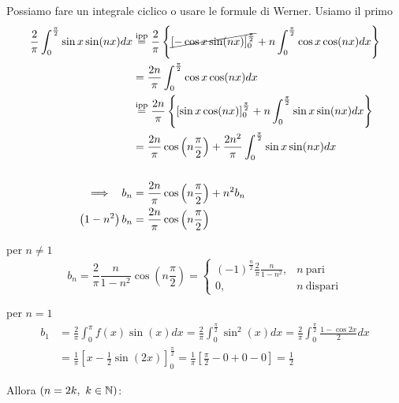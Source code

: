 \begin{enumerate}
Possiamo fare un integrale ciclico o usare le formule di Werner. Usiamo il primo\begin{align*}
\frac{2}{\pi }\int ^{\frac{\pi }{2}}_{0}\sin x\sin( nx) dx & \overset{\text{ipp}}{=}\frac{2}{\pi }\left\{\cancel{[ -\cos x\sin( nx)]^{\frac{\pi }{2}}_{0}} +n\int ^{\frac{\pi }{2}}_{0}\cos x\cos( nx) dx\right\}\\
 & =\frac{2n}{\pi }\int ^{\frac{\pi }{2}}_{0}\cos x\cos( nx) dx\\
 & \overset{\text{ipp}}{=}\frac{2n}{\pi }\left\{[\sin x\cos( nx)]^{\frac{\pi }{2}}_{0} +n\int ^{\frac{\pi }{2}}_{0}\sin x\sin( nx) dx\right\}\\
 & =\frac{2n}{\pi }\cos\left( n\frac{\pi }{2}\right) +\frac{2n^{2}}{\pi }\int ^{\frac{\pi }{2}}_{0}\sin x\sin( nx) dx\\
 & \\
\implies \ \ b_{n} & =\frac{2n}{\pi }\cos\left( n\frac{\pi }{2}\right) +n^{2} b_{n}\\
\left( 1-n^{2}\right) b_{n} & =\frac{2n}{\pi }\cos\left( n\frac{\pi }{2}\right)
\end{align*}

per $n\neq 1$\begin{equation*}
b_{n} =\frac{2}{\pi }\frac{n}{1-n^{2}}\cos\left( n\frac{\pi }{2}\right) =\begin{cases}
( -1)^{\frac{n}{2}}\frac{2}{\pi }\frac{n}{1-n^{2}} , & n\ \text{pari}\\
0, & n\ \text{dispari}
\end{cases}
\end{equation*}

per $n=1$\begin{equation*}
\begin{aligned}
b_{1} & =\frac{2}{\pi }\int ^{\pi }_{0} f( x)\sin( x) dx=\frac{2}{\pi }\int ^{\frac{\pi }{2}}_{0}\sin^{2}( x) dx=\frac{2}{\pi }\int ^{\frac{\pi }{2}}_{0}\frac{1-\cos 2x}{2} dx\\
 & =\frac{1}{\pi }\left[ x-\frac{1}{2}\sin( 2x)\right]^{\frac{\pi }{2}}_{0} =\frac{1}{\pi }\left[\frac{\pi }{2} -0+0-0\right] =\frac{1}{2}
\end{aligned}
\end{equation*}

Allora $( n=2k,\ k\in \mathbb{N} )$:


\end{enumerate}
